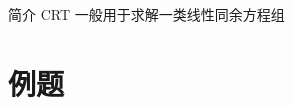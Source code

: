 \begin{frame}{简介}
	CRT 一般用于求解一类线性同余方程组
\end{frame}





\section*{例题}
\label{cgrunt:sec:crt-example}



